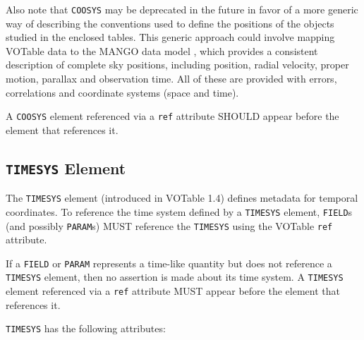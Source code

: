 \documentclass[11pt,a4paper]{ivoa}
\let\fg=\color
\def\attr#1{{\tt{\fg{DarkRed}#1}}}
\def\elem#1{{\tt{\fg{DarkRed}#1}}}
\begin{document}
Also note that \elem{COOSYS} may be deprecated in the
future in favor of a more generic way of describing the conventions used
to define the positions of the objects studied in the enclosed tables.
This generic approach could involve mapping VOTable data to the MANGO 
data model \citep{2026ivoa.spec.0529M},
which provides a consistent description of complete sky positions, including position, radial velocity,
proper motion, parallax and observation time. All of these are provided with errors,
correlations and coordinate systems (space and time). 

A \elem{COOSYS} element referenced via a \attr{ref} attribute
SHOULD appear before the element that references it.

\subsection{\elem{TIMESYS} Element}
\label{elem:TIMESYS}

The \elem{TIMESYS} element (introduced in VOTable 1.4) defines metadata
for temporal coordinates.  To reference the time system defined by a
\elem{TIMESYS} element,  \elem{FIELD}s (and possibly \elem{PARAM}s)
MUST reference the \elem{TIMESYS} using the VOTable \attr{ref} attribute.

If a \elem{FIELD} or \elem{PARAM} represents a time-like quantity but does not
reference a \elem{TIMESYS} element, then no assertion is made about its time
system. A \elem{TIMESYS} element referenced via a \attr{ref} attribute MUST appear
before the element that references it.

\elem{TIMESYS} has the following attributes:
\end{document}
